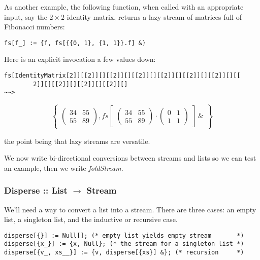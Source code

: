 \documentclass[10pt,oneside,x11names]{article}
\begin{document}
As another example, the following function, when called with an appropriate
input, say the \(2\times{2}\) identity matrix, returns a lazy stream of matrices
full of Fibonacci numbers:

\begin{verbatim}
fs[f_] := {f, fs[{{0, 1}, {1, 1}}.f] &}
\end{verbatim}

Here is an explicit invocation a few values down:

\begin{verbatim}
fs[IdentityMatrix[2]][[2]][][[2]][][[2]][][[2]][][[2]][][[2]][][[
        2]][][[2]][][[2]][][[2]][]
~~>
\end{verbatim}
\begin{equation*}
\begin{Bmatrix}
\begin{pmatrix} 34 & 55 \\ 55 & 89 \end{pmatrix},
fs
\begin{bmatrix}
\begin{pmatrix} 34 & 55 \\ 55 & 89 \end{pmatrix} \cdot
\begin{pmatrix} 0 & 1 \\ 1 & 1 \end{pmatrix} 
\end{bmatrix}\, \&
\end{Bmatrix}
\end{equation*}

\noindent the point being that lazy streams are versatile. 

We now write bi-directional conversions between streams and lists so we can test
an example, then we write \emph{foldStream}.

\subsubsection{Disperse :: List \(\rightarrow\) Stream}
\label{sec:orgheadline5}

We'll need a way to convert a list into a stream.  There are three cases: an
empty list, a singleton list, and the inductive or recursive  case.

\begin{verbatim}
disperse[{}] := Null[]; (* empty list yields empty stream       *)
disperse[{x_}] := {x, Null}; (* the stream for a singleton list *)
disperse[{v_, xs__}] := {v, disperse[{xs}] &}; (* recursion     *)
\end{verbatim}
\end{document}
